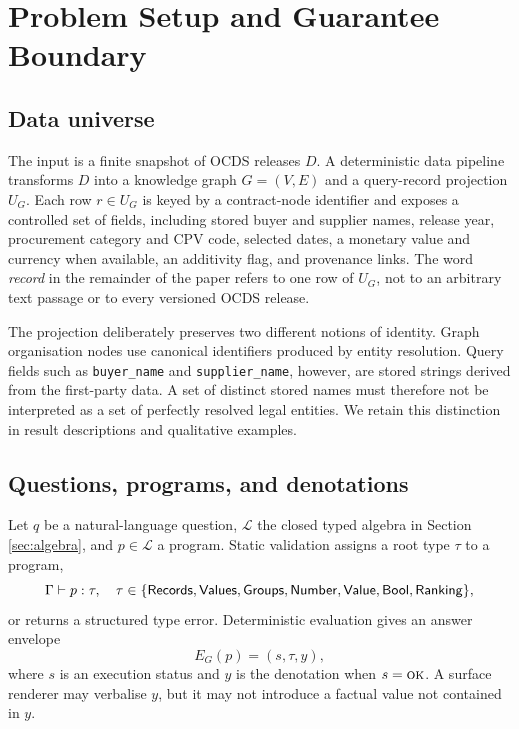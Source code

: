 \section{Problem Setup and Guarantee Boundary}
\label{sec:problem}

\subsection{Data universe}

The input is a finite snapshot of OCDS releases $D$.  A deterministic data pipeline transforms
$D$ into a knowledge graph $G=(V,E)$ and a query-record projection $U_G$.  Each row
$r\in U_G$ is keyed by a contract-node identifier and exposes a controlled set of fields,
including stored buyer and supplier names, release year, procurement category and CPV code,
selected dates, a monetary value and currency when available, an additivity flag, and provenance
links.  The word \emph{record} in the remainder of the paper refers to one row of $U_G$, not to
an arbitrary text passage or to every versioned OCDS release.

The projection deliberately preserves two different notions of identity.  Graph organisation
nodes use canonical identifiers produced by entity resolution.  Query fields such as
\texttt{buyer\_name} and \texttt{supplier\_name}, however, are stored strings derived from the
first-party data.  A set of distinct stored names must therefore not be interpreted as a set of
perfectly resolved legal entities.  We retain this distinction in result descriptions and
qualitative examples.

\subsection{Questions, programs, and denotations}

Let $q$ be a natural-language question, $\mathcal{L}$ the closed typed algebra in Section
\ref{sec:algebra}, and $p\in\mathcal{L}$ a program.  Static validation assigns a root type
$\tau$ to a program,
\begin{equation}
  \Gamma \vdash p : \tau,
  \quad
  \tau\in\{\mathsf{Records},\mathsf{Values},\mathsf{Groups},\mathsf{Number},\mathsf{Value},\mathsf{Bool},\mathsf{Ranking}\},
\end{equation}
or returns a structured type error.  Deterministic evaluation gives an answer envelope
\begin{equation}
  E_G(p) = (s,\tau,y),
\end{equation}
where $s$ is an execution status and $y$ is the denotation when $s=\textsc{ok}$.  A surface
renderer may verbalise $y$, but it may not introduce a factual value not contained in $y$.

